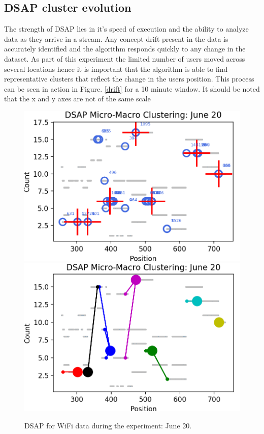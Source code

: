 \subsection{DSAP cluster evolution}
 The strength of DSAP lies in it's speed of execution and the ability to analyze data as they arrive in a stream. Any concept drift present in the data is accurately identified and the algorithm responds quickly to any change in the dataset. As part of this experiment the limited number of users moved across several locations hence it is important that the algorithm is able to find representative clusters that reflect the change in the users position. This process can be seen in action in Figure. \ref{drift} for a 10 minute window. It should be noted that the x and y axes are not of the same scale  




\begin{figure}[!h]
    \centering
    \includegraphics[width=.48\textwidth]{image/Chapters/Chapter6/DSAPJune20.png}
        \includegraphics[width=.48\textwidth]{image/Chapters/Chapter6/DSAPJune20Macro.png}
    \\[\smallskipamount]    
    \caption{ DSAP for WiFi data during the experiment: June 20. }
    \label{dsapjun20}
\end{figure}





